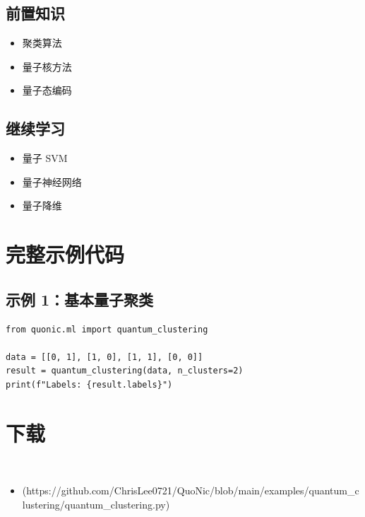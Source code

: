\documentclass[12pt,a4paper]{article}
\begin{document}
\subsection{前置知识}
\begin{itemize}
  \item 聚类算法
  \item 量子核方法
  \item 量子态编码
\end{itemize}

\subsection{继续学习}
\begin{itemize}
  \item 量子 SVM
  \item 量子神经网络
  \item 量子降维
\end{itemize}

\section{完整示例代码}

\subsection{示例 1：基本量子聚类}

\begin{lstlisting}[style=python]
from quonic.ml import quantum_clustering

data = [[0, 1], [1, 0], [1, 1], [0, 0]]
result = quantum_clustering(data, n_clusters=2)
print(f"Labels: {result.labels}")
\end{lstlisting}


\section{下载}

\begin{itemize}
  \item [quantum_clustering.py](https://github.com/ChrisLee0721/QuoNic/blob/main/examples/quantum_clustering/quantum_clustering.py)
\end{itemize}
\end{document}
